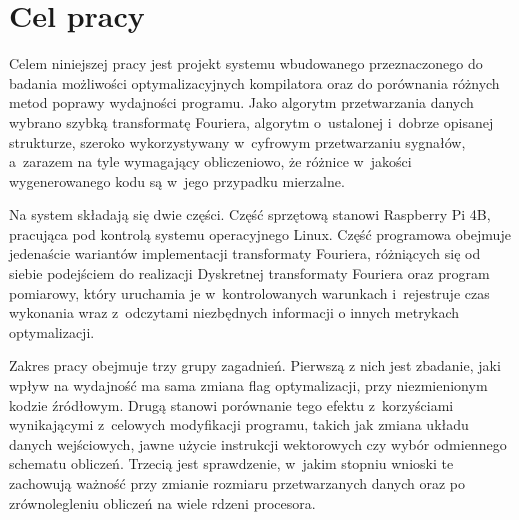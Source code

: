 \section{Cel pracy}
Celem niniejszej pracy jest projekt systemu wbudowanego przeznaczonego do
badania możliwości optymalizacyjnych kompilatora oraz do porównania różnych
metod poprawy wydajności programu. Jako algorytm przetwarzania danych wybrano  szybką
transformatę Fouriera,  algorytm o~ustalonej i~dobrze opisanej strukturze,
szeroko wykorzystywany w~cyfrowym przetwarzaniu sygnałów, a~zarazem na tyle
wymagający obliczeniowo, że różnice w~jakości wygenerowanego kodu są w~jego
przypadku mierzalne.

Na system składają się dwie części. Część sprzętową stanowi
Raspberry Pi 4B, pracująca pod
kontrolą systemu operacyjnego Linux. Część programowa obejmuje jedenaście
wariantów implementacji transformaty Fouriera, różniących się od siebie podejściem do realizacji 
Dyskretnej transformaty Fouriera oraz program
pomiarowy, który uruchamia je w~kontrolowanych warunkach i~rejestruje czas
wykonania wraz z~odczytami niezbędnych informacji o innych metrykach optymalizacji.

Zakres pracy obejmuje trzy grupy zagadnień. Pierwszą z nich jest zbadanie, jaki wpływ
na wydajność ma sama zmiana flag optymalizacji, przy niezmienionym kodzie źródłowym. 
Drugą stanowi porównanie tego efektu z~korzyściami wynikającymi z~celowych modyfikacji programu, takich jak
zmiana układu danych wejściowych, jawne użycie instrukcji wektorowych czy wybór
odmiennego schematu obliczeń. Trzecią jest sprawdzenie, w~jakim stopniu wnioski
te zachowują ważność przy zmianie rozmiaru przetwarzanych danych oraz po
zrównolegleniu obliczeń na wiele rdzeni procesora.
